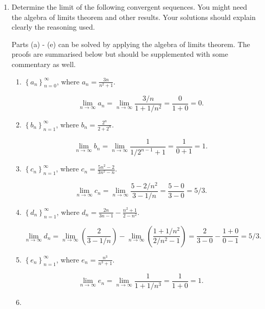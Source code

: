 \documentclass[oneside,10pt]{amsart}
\newcounter{pass}
\begin{document}
\begin{enumerate}
\setcounter{enumi}{\value{pass}}
\item
Determine the limit of the following convergent sequences. You might need the algebra of limits theorem and other results. Your solutions should explain clearly the reasoning used.
\begin{solution}{Parts (a) - (e) can be solved by applying the algebra of limits theorem. The proofs are summarised below but should be supplemented with some commentary as well.}\end{solution}
    \begin{enumerate} 
    \item
    $\left \{ a_n \right \}_{n=0}^\infty$, where $a_n = \frac{3n}{n^2 + 1}$.
    \begin{solution}{
    $$\lim_{n \to \infty} a_n = \lim_{n \to \infty} \frac{3/n}{1+1/n^2} = \frac{0}{1+0} = 0.$$}\end{solution}
    \item
    $\left \{ b_n \right \}_{n=1}^\infty$, where $b_n = \frac{2^n}{2+2^n}$.
    \begin{solution}{
    $$\lim_{n \to \infty} b_n = \lim_{n \to \infty} \frac{1}{1/2^{n-1}+1} = \frac{1}{0+1} = 1.$$}\end{solution}
    \item
    $\left \{ c_n \right \}_{n=1}^\infty$, where $c_n = \frac{5n^2 - 2}{3n^2 - n}$.
    \begin{solution}{
    $$\lim_{n \to \infty} c_n = \lim_{n \to \infty} \frac{5 - 2/n^2}{3 - 1/n} = \frac{5 - 0}{3 - 0} = 5/3.$$}\end{solution}
    \item
    $\left \{ d_n \right \}_{n=1}^\infty$, where $d_n = \frac{2n}{3n - 1} - \frac{n^2 + 1}{2 - n^2}$.
    \begin{solution}{
    $$\lim_{n \to \infty} d_n = \lim_{n \to \infty} \left ( \frac{2}{3 - 1/n} \right ) - \lim_{n\to \infty} \left ( \frac{1 + 1/n^2}{2/n^2 - 1} \right )= \frac{2}{3 - 0} - \frac{1+0}{0 -1}= 5/3.$$}\end{solution}
    \item
    $\left \{ e_n \right \}_{n=1}^\infty$, where $e_n = \frac{n^3}{n^3 + 1}$.
    \begin{solution}{
    $$\lim_{n \to \infty} e_n = \lim_{n \to \infty} \frac{1}{1+1/n^3} = \frac{1}{1+0} = 1.$$}\end{solution}
    \item

\end{enumerate}
\end{enumerate}
\end{document}
